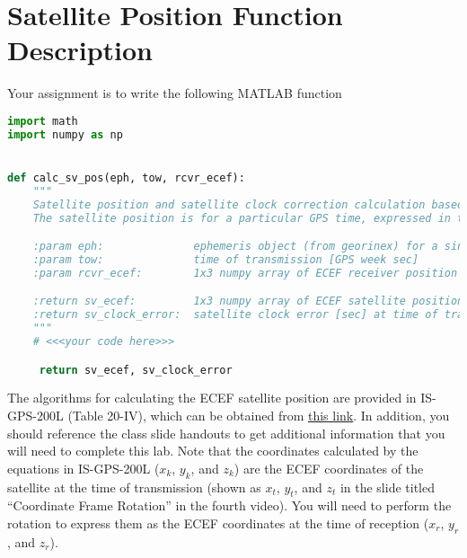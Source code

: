 \documentclass[12pt]{article}
\begin{document}
\section*{\textsf{Satellite Position Function Description}}

Your assignment is to write the following MATLAB function

\begin{lstlisting}[language = Python]
import math
import numpy as np


def calc_sv_pos(eph, tow, rcvr_ecef):
    """
    Satellite position and satellite clock correction calculation based on IS-GPS-200L (Table 20-IV and pp. 95-96).
    The satellite position is for a particular GPS time, expressed in the ECEF coordinate frame valid at the time the signal was received by a GPS receiver.

    :param eph:              ephemeris object (from georinex) for a single satellite and time epoch
    :param tow:              time of transmission [GPS week sec]
    :param rcvr_ecef:        1x3 numpy array of ECEF receiver position [x y z in meters]

    :return sv_ecef:         1x3 numpy array of ECEF satellite position [x y z in meters] at time of transmission, expressed in ECEF frame at the time of reception
    :return sv_clock_error:  satellite clock error [sec] at time of transmission
    """
    # <<<your code here>>>

     return sv_ecef, sv_clock_error
\end{lstlisting}


The algorithms for calculating the ECEF satellite position are provided in
IS-GPS-200L (Table 20-IV), which can be obtained from \href{https://www.gps.gov/technical/icwg/IS-GPS-200L.pdf}{this link}.
In addition, you should reference the class slide handouts
to get additional information that you will need to complete this lab.  Note
that the coordinates calculated by the equations in IS-GPS-200L ($x_k$, $y_k$,
and $z_k$) are the ECEF coordinates of the satellite at the time of transmission
(shown as $x_t$, $y_t$, and $z_t$ in the slide titled ``Coordinate Frame
Rotation'' in the fourth video).  You will need to perform the rotation to
express them as the ECEF coordinates at the time of reception ($x_r$, $y_r$, and
$z_r$).
\end{document}

